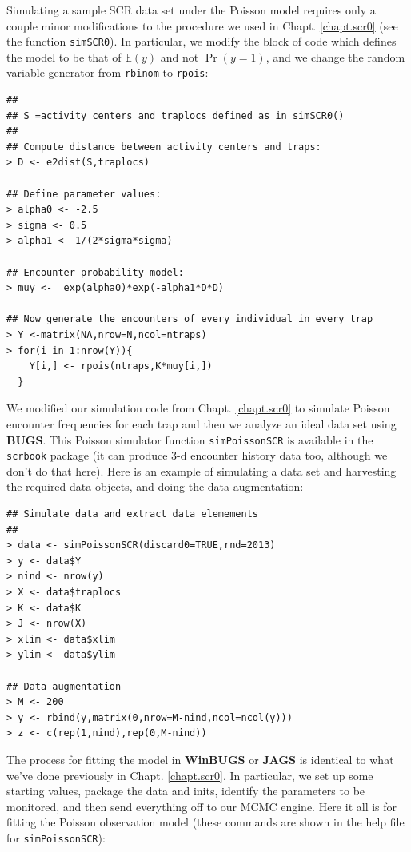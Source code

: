 Simulating a sample SCR data set under the Poisson model requires only
a couple minor modifications to the procedure we used in
Chapt. \ref{chapt.scr0} (see the function \mbox{\tt simSCR0}). In
particular, we modify the block of code which defines the model to be
that of $\mathbb{E}(y)$ and not $\Pr(y=1)$, and we change the random
variable generator from \mbox{\tt rbinom} to \mbox{\tt rpois}:
{\small
\begin{verbatim}
##
## S =activity centers and traplocs defined as in simSCR0()
##
## Compute distance between activity centers and traps:
> D <- e2dist(S,traplocs) 

## Define parameter values:
> alpha0 <- -2.5
> sigma <- 0.5
> alpha1 <- 1/(2*sigma*sigma)

## Encounter probability model:
> muy <-  exp(alpha0)*exp(-alpha1*D*D)

## Now generate the encounters of every individual in every trap
> Y <-matrix(NA,nrow=N,ncol=ntraps)
> for(i in 1:nrow(Y)){
    Y[i,] <- rpois(ntraps,K*muy[i,])
  }
\end{verbatim}
}


We modified our simulation code from Chapt. \ref{chapt.scr0} to
simulate Poisson encounter frequencies for each trap and then we
analyze an ideal data set using {\bf BUGS}. This Poisson simulator
function {\tt simPoissonSCR} is available in the \mbox{\tt scrbook}
package (it can produce 3-d encounter history data too, although we
don't do that here).  Here is an example of simulating a data set and
harvesting the required data objects, and doing the data augmentation:
{\small
\begin{verbatim}
## Simulate data and extract data elemements
##
> data <- simPoissonSCR(discard0=TRUE,rnd=2013)
> y <- data$Y
> nind <- nrow(y)
> X <- data$traplocs
> K <- data$K
> J <- nrow(X)
> xlim <- data$xlim
> ylim <- data$ylim

## Data augmentation
> M <- 200
> y <- rbind(y,matrix(0,nrow=M-nind,ncol=ncol(y)))
> z <- c(rep(1,nind),rep(0,M-nind))
\end{verbatim}
}


The process for fitting
the model in {\bf WinBUGS} or {\bf JAGS} is identical to what we've done
previously in Chapt. \ref{chapt.scr0}. In particular, we set up some
starting values, package the data and inits, identify the parameters
to be monitored, and then send everything off to our MCMC engine. Here
it all is for fitting the Poisson observation model (these commands
are shown in the help file for \mbox{\tt simPoissonSCR}):

